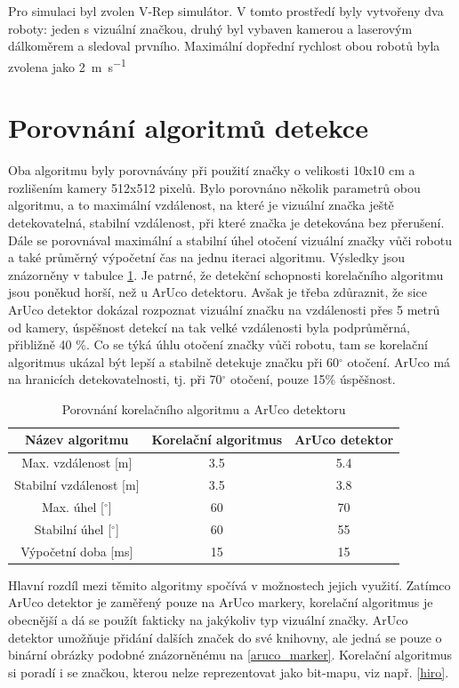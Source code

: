\documentclass[twoside]{ctuthesis}
\theoremstyle{plain}
\theoremstyle{definition}
\theoremstyle{note}
\begin{document}
Pro simulaci byl zvolen V-Rep simulátor. V tomto prostředí byly vytvořeny dva roboty: jeden s vizuální značkou, druhý byl vybaven kamerou a laserovým dálkoměrem a sledoval prvního. Maximální dopřední rychlost obou robotů byla zvolena jako \SI{2}{\meter\per\second}

\section{Porovnání algoritmů detekce}

Oba algoritmu byly porovnávány při použití značky o velikosti 10x10 cm a rozlišením kamery 512x512 pixelů. Bylo porovnáno několik parametrů obou algoritmu, a to maximální vzdálenost, na které je vizuální značka ještě detekovatelná, stabilní vzdálenost, při které značka je detekována bez přerušení. Dále se porovnával maximální a stabilní úhel otočení vizuální značky vůči robotu a také průměrný výpočetní čas na jednu iteraci algoritmu. Výsledky jsou znázorněny v tabulce \ref{porovnani}. Je patrné, že detekční schopnosti korelačního algoritmu jsou poněkud horší, než u ArUco detektoru. Avšak je třeba zdůraznit, že sice ArUco detektor dokázal rozpoznat vizuální značku na vzdálenosti přes 5 metrů od kamery, úspěšnost detekcí na tak velké vzdálenosti byla podprůměrná, přibližně 40 \%. Co se týká úhlu otočení značky vůči robotu, tam se korelační algoritmus ukázal být lepší a stabilně detekuje značku při 60$^\circ$ otočení. ArUco má na hranicích detekovatelnosti, tj. při 70$^\circ$ otočení, pouze 15\% úspěšnost.

\begin{table}[hbt]
	\centering
	\caption{Porovnání korelačního algoritmu a ArUco detektoru}
	\label{porovnani}
	\begin{tabular}{|c|c|c|}
		\hline
		Název algoritmu              & Korelační algoritmus & ArUco detektor \\ \hline
		Max. vzdálenost {[}m{]}      & 3.5                 & 5.4           \\ \hline
		Stabilní vzdálenost {[}m{]}  & 3.5                 & 3.8           \\ \hline
		Max. úhel {[}$^\circ${]}     & 60                   & 70             \\ \hline
		Stabilní úhel {[}$^\circ${]} & 60                   & 55             \\ \hline
		Výpočetní doba {[}ms{]}      & 15                   & 15             \\ \hline
	\end{tabular}
\end{table}
Hlavní rozdíl mezi těmito algoritmy spočívá v možnostech jejich využití. Zatímco ArUco detektor je zaměřený pouze na ArUco markery, korelační algoritmus je obecnější a dá se použít fakticky na jakýkoliv typ vizuální značky. ArUco detektor umožňuje přidání dalších značek do své knihovny, ale jedná se pouze o binární obrázky podobné znázorněnému na \ref{aruco_marker}. Korelační algoritmus si poradí i se značkou, kterou nelze reprezentovat jako bit-mapu, viz např. \ref{hiro}.
\end{document}

